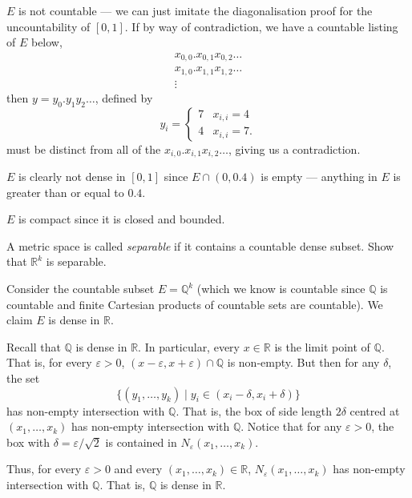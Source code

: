 \documentclass[12 pt, letterpaper]{hmcpset}
\begin{document}
\begin{solution}
	$E$ is not countable --- we can just imitate the diagonalisation proof for the uncountability of $[0, 1]$. If by way of contradiction, we have a countable listing of $E$ below,
	\[
		\begin{gathered}
			x_{0, 0}.x_{0, 1} x_{0, 2} \dots \\
			x_{1, 0}.x_{1, 1} x_{1, 2} \dots \\
			\vdots
		\end{gathered}
	\]
	then $y = y_{0}.y_{1} y_{2} \dots$, defined by
	\[
		y_{i} = \begin{cases}
			7 & x_{i, i} = 4 \\
			4 & x_{i, i} = 7.
		\end{cases}
	\]
	must be distinct from all of the $x_{i, 0}.x_{i, 1} x_{i, 2} \dots$, giving us a contradiction.

	$E$ is clearly not dense in $[0, 1]$ since $E \cap (0, 0.4)$ is empty --- anything in $E$ is greater than or equal to $0.4$.

	$E$ is compact since it is closed and bounded.
\end{solution}

\pagebreak

\begin{problem}
	A metric space is called \emph{separable} if it contains a countable dense subset. Show that $\mathbb{R}^{k}$ is separable.
\end{problem}

\begin{solution}
	Consider the countable subset $E = \mathbb{Q}^{k}$ (which we know is countable since $\mathbb{Q}$ is countable and finite Cartesian products of countable sets are countable). We claim $E$ is dense in $\mathbb{R}$.

	Recall that $\mathbb{Q}$ is dense in $\mathbb{R}$. In particular, every $x \in \mathbb{R}$ is the limit point of $\mathbb{Q}$. That is, for every $\varepsilon > 0$,  $(x - \varepsilon, x + \varepsilon) \cap \mathbb{Q}$ is non-empty. But then for any $\delta$, the set
	\[
		\{ (y_{1}, \dots, y_{k}) \mid y_{i} \in (x_{i} - \delta, x_{i} + \delta) \}
	\]
	has non-empty intersection with $\mathbb{Q}$. That is, the box of side length $2 \delta$ centred at $(x_{1}, \dots, x_{k})$ has non-empty intersection with $\mathbb{Q}$.  Notice that for any $\varepsilon > 0$, the box with $\delta = \varepsilon/\sqrt{2}$ is contained in $N_{\varepsilon}(x_{1}, \dots, x_{k})$. 

	Thus, for every $\varepsilon > 0$ and every $(x_{1}, \dots, x_{k}) \in \mathbb{R}$, $N_{\varepsilon}(x_{1}, \dots, x_{k})$ has non-empty intersection with $\mathbb{Q}$. That is, $\mathbb{Q}$ is dense in $\mathbb{R}$.
\end{solution}
\end{document}
